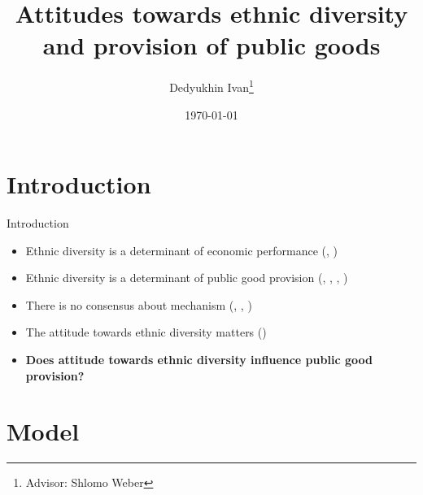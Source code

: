 \documentclass[c]{beamer}  %
\title[Thesis]{Attitudes towards ethnic diversity and provision of public goods}
\author[Dedyukhin Ivan]{Dedyukhin Ivan\thanks{Advisor: Shlomo Weber}}
\date{\today}
\institute[NES]{New Economic School}
\begin{document}
	
	\frame[plain]{\titlepage}	%

    \section{Introduction}

    \begin{frame}{Introduction}
        \begin{itemize}
            \item Ethnic diversity is a determinant of economic performance (\cite{Russia}, \cite{Africa})
            \pause
            \item Ethnic diversity is a determinant of public good provision (\cite{AlesinaDivision}, \cite{Kenya}, \cite{Indonesia}, \cite{transfer})
            \pause
            \item There is no consensus about mechanism (\cite{WhyUndermine}, \cite{Cooperation}, \cite{difference})
            \pause
            \item The attitude towards ethnic diversity matters (\cite{Refuges})
            \pause
            \item \textbf{Does attitude towards ethnic diversity influence public good provision?}
        \end{itemize}
    \end{frame}
    
    \section{Model}
    
\end{document}
